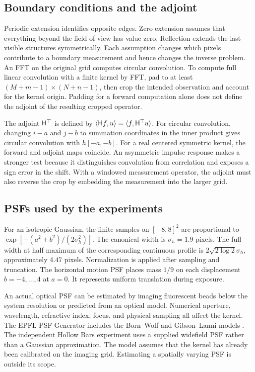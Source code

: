 \subsection{Boundary conditions and the adjoint}

Periodic extension identifies opposite edges. Zero extension assumes that everything beyond the field of view has value zero. Reflection extends the last visible structures symmetrically. Each assumption changes which pixels contribute to a boundary measurement and hence changes the inverse problem. An FFT on the original grid computes circular convolution. To compute full linear convolution with a finite kernel by FFT, pad to at least \((M+m-1)\times(N+n-1)\), then crop the intended observation and account for the kernel origin. Padding for a forward computation alone does not define the adjoint of the resulting cropped operator.

The adjoint \(\mathsf H^\top\) is defined by
\(\langle \mathsf H f,u\rangle=\langle f,\mathsf H^\top u\rangle\).
For circular convolution, changing \(i-a\) and \(j-b\) to summation coordinates in the inner product gives circular convolution with \(h[-a,-b]\). For a real centered symmetric kernel, the forward and adjoint maps coincide. An asymmetric impulse response makes a stronger test because it distinguishes convolution from correlation and exposes a sign error in the shift. With a windowed measurement operator, the adjoint must also reverse the crop by embedding the measurement into the larger grid.

\subsection{PSFs used by the experiments}

For an isotropic Gaussian, the finite samples on \([-8,8]^2\) are proportional to
\(\exp[-(a^2+b^2)/(2\sigma_h^2)]\). The canonical width is \(\sigma_h=1.9\) pixels. The full width at half maximum of the corresponding continuous profile is \(2\sqrt{2\log 2}\sigma_h\), approximately \(4.47\) pixels. Normalization is applied after sampling and truncation. The horizontal motion PSF places mass \(1/9\) on each displacement \(b=-4,\ldots,4\) at \(a=0\). It represents uniform translation during exposure.

An actual optical PSF can be estimated by imaging fluorescent beads below the system resolution or predicted from an optical model. Numerical aperture, wavelength, refractive index, focus, and physical sampling all affect the kernel. The EPFL PSF Generator includes the Born--Wolf and Gibson--Lanni models \citep{psfgen,sage}. The independent Hollow Bars experiment uses a supplied widefield PSF rather than a Gaussian approximation. The model assumes that the kernel has already been calibrated on the imaging grid. Estimating a spatially varying PSF is outside its scope.

